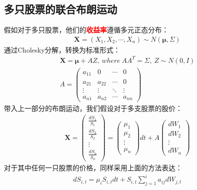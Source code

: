 \documentclass{article}
\begin{document}
    \subsection{多只股票的联合布朗运动}
    \qquad 假如对于多只股票，他们的\textcolor{red}{\textbf{收益率}}遵循多元正态分布：
    \begin{align}
        \boldsymbol{X} = (X_1,X_2,\cdots,X_n)\sim N(\boldsymbol{\mu},\varSigma)
    \end{align}
    \qquad 通过Cholesky分解，转换为标准形式：
    \begin{gather}
        \boldsymbol{X} = \boldsymbol{\mu}+AZ,\ where\ AA^T=\varSigma,\ Z\sim N(0,I) \\
        A=\begin{pmatrix}
            a_{11}&0&\cdots&0\\
            a_{21}&a_{22}&\cdots&0\\
            \vdots&\vdots&\ddots&\vdots\\
            a_{n1}&a_{n2}&\cdots&a_{nn}
        \end{pmatrix}\nonumber
    \end{gather}
    \qquad 带入上一部分的布朗运动，我们假设对于多支股票的股价：
    \begin{align}
        \boldsymbol{X}=\begin{pmatrix}
            \frac{dS_1}{S_1}\\
            \frac{dS_2}{S_2}\\
            \vdots\\
            \frac{dS_n}{S_n}
        \end{pmatrix}=\begin{pmatrix}
            \mu_1\\
            \mu_2\\
            \vdots\\
            \mu_n
        \end{pmatrix}dt+A\begin{pmatrix}
            dW_1\\
            dW_2\\
            \vdots\\
            dW_n
        \end{pmatrix}
    \end{align}
    \qquad 对于其中任何一只股票的价格，同样采用上面的方法表达：
    \begin{gather}
        dS_{i,t}=\mu_i S_{i,t}dt+S_{i,t}\sum_{j=1}^{i}a_{ij}dW_{j,t}
    \end{gather}
\end{document}
